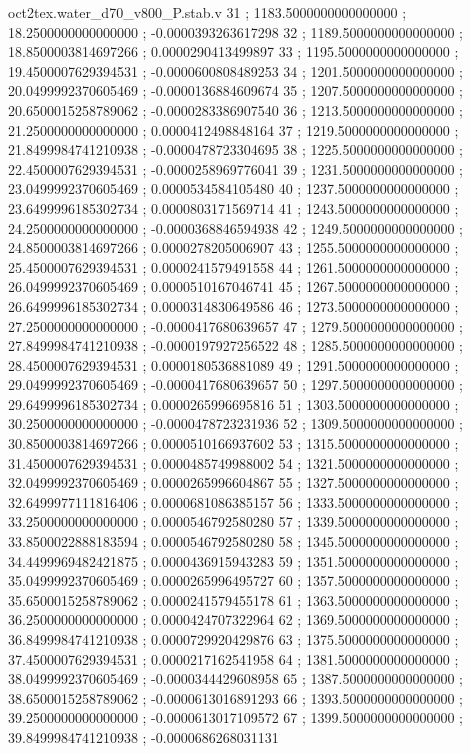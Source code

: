 \begin{filecontents}[overwrite]{oct2tex.water_d70_v800_P.stab.v}
31 ; 1183.5000000000000000 ; 18.2500000000000000 ; -0.0000393263617298
32 ; 1189.5000000000000000 ; 18.8500003814697266 ; 0.0000290413499897
33 ; 1195.5000000000000000 ; 19.4500007629394531 ; -0.0000600808489253
34 ; 1201.5000000000000000 ; 20.0499992370605469 ; -0.0000136884609674
35 ; 1207.5000000000000000 ; 20.6500015258789062 ; -0.0000283386907540
36 ; 1213.5000000000000000 ; 21.2500000000000000 ; 0.0000412498848164
37 ; 1219.5000000000000000 ; 21.8499984741210938 ; -0.0000478723304695
38 ; 1225.5000000000000000 ; 22.4500007629394531 ; -0.0000258969776041
39 ; 1231.5000000000000000 ; 23.0499992370605469 ; 0.0000534584105480
40 ; 1237.5000000000000000 ; 23.6499996185302734 ; 0.0000803171569714
41 ; 1243.5000000000000000 ; 24.2500000000000000 ; -0.0000368846594938
42 ; 1249.5000000000000000 ; 24.8500003814697266 ; 0.0000278205006907
43 ; 1255.5000000000000000 ; 25.4500007629394531 ; 0.0000241579491558
44 ; 1261.5000000000000000 ; 26.0499992370605469 ; 0.0000510167046741
45 ; 1267.5000000000000000 ; 26.6499996185302734 ; 0.0000314830649586
46 ; 1273.5000000000000000 ; 27.2500000000000000 ; -0.0000417680639657
47 ; 1279.5000000000000000 ; 27.8499984741210938 ; -0.0000197927256522
48 ; 1285.5000000000000000 ; 28.4500007629394531 ; 0.0000180536881089
49 ; 1291.5000000000000000 ; 29.0499992370605469 ; -0.0000417680639657
50 ; 1297.5000000000000000 ; 29.6499996185302734 ; 0.0000265996695816
51 ; 1303.5000000000000000 ; 30.2500000000000000 ; -0.0000478723231936
52 ; 1309.5000000000000000 ; 30.8500003814697266 ; 0.0000510166937602
53 ; 1315.5000000000000000 ; 31.4500007629394531 ; 0.0000485749988002
54 ; 1321.5000000000000000 ; 32.0499992370605469 ; 0.0000265996604867
55 ; 1327.5000000000000000 ; 32.6499977111816406 ; 0.0000681086385157
56 ; 1333.5000000000000000 ; 33.2500000000000000 ; 0.0000546792580280
57 ; 1339.5000000000000000 ; 33.8500022888183594 ; 0.0000546792580280
58 ; 1345.5000000000000000 ; 34.4499969482421875 ; 0.0000436915943283
59 ; 1351.5000000000000000 ; 35.0499992370605469 ; 0.0000265996495727
60 ; 1357.5000000000000000 ; 35.6500015258789062 ; 0.0000241579455178
61 ; 1363.5000000000000000 ; 36.2500000000000000 ; 0.0000424707322964
62 ; 1369.5000000000000000 ; 36.8499984741210938 ; 0.0000729920429876
63 ; 1375.5000000000000000 ; 37.4500007629394531 ; 0.0000217162541958
64 ; 1381.5000000000000000 ; 38.0499992370605469 ; -0.0000344429608958
65 ; 1387.5000000000000000 ; 38.6500015258789062 ; -0.0000613016891293
66 ; 1393.5000000000000000 ; 39.2500000000000000 ; -0.0000613017109572
67 ; 1399.5000000000000000 ; 39.8499984741210938 ; -0.0000686268031131

\end{filecontents}
